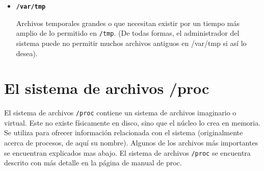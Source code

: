 \begin{itemize}
	\item 
        
	\textbf{\texttt{/var/tmp}} 
        
	 Archivos temporales grandes o que necesitan existir por
	un tiempo más amplio de lo permitido en \texttt{/tmp}.  (De
	todas formas, el administrador del sistema puede no permitir muchos
	archivos antiguos en /var/tmp si así lo desea).  
	  \end{itemize}  


\section{ El sistema de archivos /proc}

El sistema de archivos \texttt{/proc} contiene un sistema de
archivos imaginario o virtual. Este no existe físicamente en disco, sino que el
núcleo lo crea en memoria. Se utiliza para ofrecer información relacionada con
el sistema (originalmente acerca de procesos, de aquí su nombre). Algunos de los
archivos más importantes se encuentran explicados mas abajo. El sistema de
archivos \texttt{/proc} se encuentra descrito con más detalle en la
página de manual de proc.

